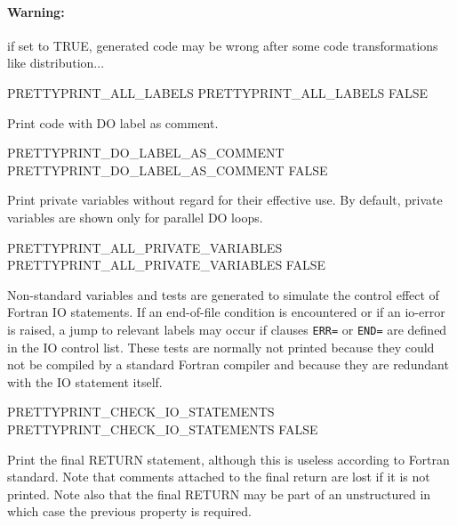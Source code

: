 \documentclass[a4paper]{report}
\begin{document}
\paragraph{Warning:} if set to TRUE, generated code may be
wrong after some code transformations like distribution...

\begin{PipsProp}{PRETTYPRINT_ALL_LABELS}
PRETTYPRINT_ALL_LABELS FALSE
\end{PipsProp}

Print code with DO label as comment.

\begin{PipsProp}{PRETTYPRINT_DO_LABEL_AS_COMMENT}
PRETTYPRINT_DO_LABEL_AS_COMMENT FALSE
\end{PipsProp}

Print private variables without regard for their effective use. By
default, private variables are shown only for parallel DO loops.

\begin{PipsProp}{PRETTYPRINT_ALL_PRIVATE_VARIABLES}
PRETTYPRINT_ALL_PRIVATE_VARIABLES FALSE
\end{PipsProp}

Non-standard variables and tests are generated to simulate the control
effect of Fortran IO statements. If an end-of-file condition is
encountered or if an io-error is raised, a jump to relevant labels may
occur if clauses \verb|ERR=| or \verb|END=| are defined in the IO
control list. These tests are normally not printed because they could
not be compiled by a standard Fortran compiler and because they are
redundant with the IO statement itself.

\begin{PipsProp}{PRETTYPRINT_CHECK_IO_STATEMENTS}
PRETTYPRINT_CHECK_IO_STATEMENTS FALSE
\end{PipsProp}

%

Print the final RETURN statement, although this is useless according to
Fortran standard. Note that comments attached to the final return are
lost if it is not printed. Note also that the final RETURN may be part
of an unstructured in which case the previous property is required.
\end{document}
